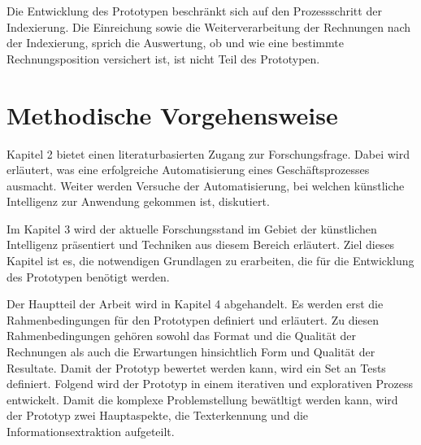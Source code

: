\documentclass{hwz}
\newcommand{\mysection}[1]{
    \newpage
    \section{#1}
}
\begin{document}
Die Entwicklung des Prototypen beschränkt sich auf den Prozessschritt der Indexierung. Die Einreichung sowie die Weiterverarbeitung der Rechnungen nach der Indexierung, sprich die Auswertung, ob und wie eine bestimmte Rechnungsposition versichert ist, ist nicht Teil des Prototypen.


\mysection{Methodische Vorgehensweise}


Kapitel 2 bietet einen literaturbasierten Zugang zur Forschungsfrage. Dabei wird erläutert, was eine erfolgreiche Automatisierung eines Geschäftsprozesses ausmacht. Weiter werden Versuche der Automatisierung, bei welchen künstliche Intelligenz zur Anwendung gekommen ist, diskutiert.

Im Kapitel 3 wird der aktuelle Forschungsstand im Gebiet der künstlichen Intelligenz präsentiert und Techniken aus diesem Bereich erläutert. Ziel dieses Kapitel ist es, die notwendigen Grundlagen zu erarbeiten, die für die Entwicklung des Prototypen benötigt werden.

Der Hauptteil der Arbeit wird in Kapitel 4 abgehandelt. Es werden erst die Rahmenbedingungen für den Prototypen definiert und erläutert. Zu diesen Rahmenbedingungen gehören sowohl das Format und die Qualität der Rechnungen als auch die Erwartungen hinsichtlich Form und Qualität der Resultate. Damit der Prototyp bewertet werden kann, wird ein Set an Tests definiert. Folgend wird der Prototyp in einem iterativen und explorativen Prozess entwickelt. Damit die komplexe Problemstellung bewätltigt werden kann, wird der Prototyp zwei Hauptaspekte, die Texterkennung und die Informationsextraktion aufgeteilt.
\end{document}
